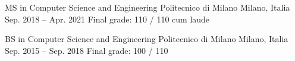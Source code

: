 

\begin{cventries}

\cventry
    {MS in Computer Science and Engineering}
    {Politecnico di Milano}
    {Milano, Italia}
    {Sep. 2018 -- Apr. 2021}
    {Final grade: 110 / 110 cum laude}
    
\cventry
    {BS in Computer Science and Engineering}
    {Politecnico di Milano}
    {Milano, Italia}
    {Sep. 2015 -- Sep. 2018}
    {Final grade: 100 / 110}
    
\end{cventries}
